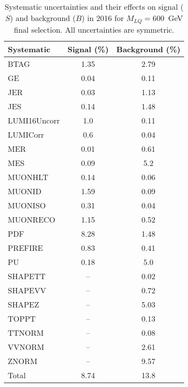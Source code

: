 \begin{table}[htbp]
\begin{center}
\caption{Systematic uncertainties and their effects on signal ($S$) and background ($B$) in 2016 for $M_{LQ}=600$~GeV final selection. All uncertainties are symmetric.}
\begin{tabular}{lcc}
\hline\hline
Systematic & Signal (\%) & Background (\%) \\ \hline 
BTAG & 1.35 & 2.79\\ 
GE & 0.04 & 0.11\\ 
JER & 0.03 & 1.13\\ 
JES & 0.14 & 1.48\\ 
LUMI16Uncorr & 1.0 & 0.11\\ 
LUMICorr & 0.6 & 0.04\\ 
MER & 0.01 & 0.61\\ 
MES & 0.09 & 5.2\\ 
MUONHLT & 0.14 & 0.06\\ 
MUONID & 1.59 & 0.09\\ 
MUONISO & 0.31 & 0.04\\ 
MUONRECO & 1.15 & 0.52\\ 
PDF & 8.28 & 1.48\\ 
PREFIRE & 0.83 & 0.41\\ 
PU & 0.18 & 5.0\\ 
SHAPETT & -- & 0.02\\ 
SHAPEVV & -- & 0.72\\ 
SHAPEZ & -- & 5.03\\ 
TOPPT & -- & 0.13\\ 
TTNORM & -- & 0.08\\ 
VVNORM & -- & 2.61\\ 
ZNORM & -- & 9.57\\ 
Total & 8.74 & 13.8\\ \hline \hline
\end{tabular}
\label{tab:SysUncertainties_uujj_600}
\end{center}
\end{table}

